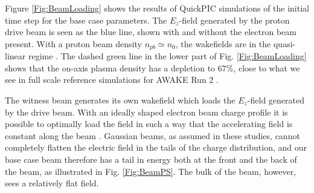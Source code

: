 \documentclass[aps,prstab,reprint,amsmath,amssymb,groupedaddress]{revtex4-1}
\begin{document}
Figure \ref{Fig:BeamLoading} shows the results of QuickPIC simulations of the initial time step for the base case
parameters. The $E_{z}$-field generated by the proton drive beam is seen as the blue line, shown with and without the
electron beam present. With a proton beam density $n_{pb} \simeq n_{0}$, the wakefields are in the quasi-linear regime
\cite{rosenzweig:2010}. The dashed green line in the lower part of Fig. \ref{Fig:BeamLoading} shows that the on-axis
plasma density has a depletion to $67\%$, close to what we see in full scale reference simulations for AWAKE Run 2
\cite{awake_collaboration:2016}.


The witness beam generates its own wakefield which loads the $E_{z}$-field generated by the drive beam. With an ideally
shaped electron beam charge profile it is possible to optimally load the field in such a way that the accelerating field
is constant along the beam \cite{katsouleas:1987, tzoufras:2009}. Gaussian beams, as assumed in these studies, cannot
completely flatten the electric field in the tails of the charge distribution, and our base case beam therefore has a
tail in energy both at the front and the back of the beam, as illustrated in Fig. \ref{Fig:BeamPS}. The bulk of the
beam, however, sees a relatively flat field.
\end{document}
